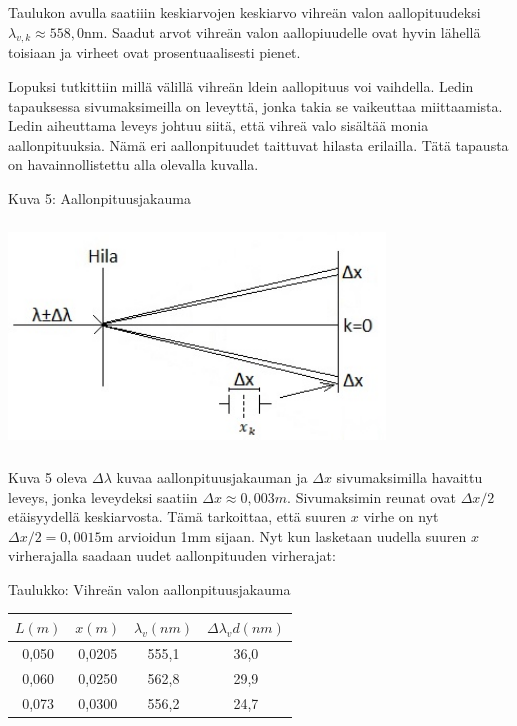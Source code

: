 \documentclass[11pt,a4paper]{article}
\begin{document}
\vspace{0.2cm}

\noindent Taulukon avulla saatiiin keskiarvojen keskiarvo vihreän valon aallopituudeksi ${\lambda}_{v,k} \approx 558,0$nm. Saadut arvot vihreän valon aallopiuudelle ovat hyvin lähellä toisiaan ja virheet ovat prosentuaalisesti pienet. 

\noindent Lopuksi tutkittiin millä välillä vihreän ldein aallopituus voi vaihdella. Ledin tapauksessa sivumaksimeilla on leveyttä, jonka takia se vaikeuttaa miittaamista. Ledin aiheuttama leveys johtuu siitä, että vihreä valo sisältää monia aallonpituuksia. Nämä eri aallonpituudet taittuvat hilasta erilailla. Tätä tapausta on havainnollistettu alla olevalla kuvalla.

\vspace{0.2cm}

\noindent Kuva 5: Aallonpituusjakauma 

\includegraphics[width=10cm, height=6cm]{Aallonpituusjakauma.jpg}


\noindent Kuva 5 oleva $\Delta \lambda$ kuvaa aallonpituusjakauman ja $\Delta x$ sivumaksimilla havaittu leveys, jonka leveydeksi saatiin $\Delta x \approx 0,003m$. Sivumaksimin reunat ovat $\Delta x/2$ etäisyydellä keskiarvosta. Tämä tarkoittaa, että suuren $x$ virhe on nyt $\Delta x/2 = 0,0015$m arvioidun 1mm sijaan. Nyt kun lasketaan uudella suuren $x$ virherajalla saadaan uudet aallonpituuden virherajat: 

\noindent Taulukko: Vihreän valon aallonpituusjakauma 

\vspace{0.2cm}

\hspace{2cm}\begin{tabular}{|c|c|c|c|}
\hline
$L(m)$ & $x(m)$ & ${\lambda}_v (nm)$ & $\Delta {\lambda}_v d(nm)$ \\
\hline
0,050 & 0,0205 & 555,1 & 36,0 \\
\hline
0,060 & 0,0250 & 562,8 & 29,9\\
\hline 
0,073 & 0,0300 & 556,2 & 24,7 \\
\hline

\end{tabular}
\end{document}
